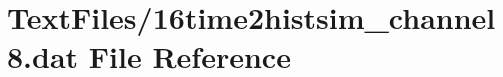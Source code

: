 \hypertarget{16time2histsim__channel8_8dat}{}\section{Text\+Files/16time2histsim\+\_\+channel8.dat File Reference}
\label{16time2histsim__channel8_8dat}
